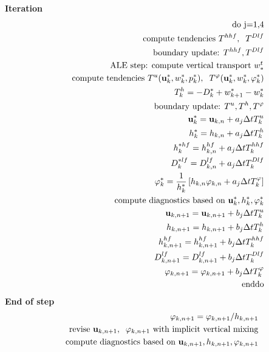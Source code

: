 \documentclass[11pt]{report}
\begin{document}
{\bf Iteration}
\begin{eqnarray} &&
\mbox{do j=1,4} \\&& \hspace{.5cm}
\mbox{compute tendencies } T^{hhf}, \;\;T^{Dlf} \\ && \hspace{.5cm}
\mbox{boundary update: } T^{hhf},T^{Dlf}\\&& \hspace{.5cm}
\mbox{ALE step: compute vertical transport $w^t_*$} \\ && \hspace{.5cm}
\mbox{compute tendencies } 
T^u({\bf u}_k^*,w_k^*,p_k^*), \;\;
T^\varphi({\bf u}_k^*,w_k^*,\varphi_k^*) \\ && \hspace{.5cm}\hspace{.5cm}
T^h_k = -D_k^* + w_{k+1}^* - w_{k}^* \\ && \hspace{.5cm}
\mbox{boundary update: } T^u,T^h,T^\varphi\\&& \hspace{.5cm}
{\bf u}^*_k = {\bf u}_{k,n} + a_j \Delta t T^u_k \\&& \hspace{.5cm}
h^*_k = h_{k,n} + a_j \Delta t T^h_k \\&& \hspace{.5cm}
h^{*hf}_k = h^{hf}_{k,n} + a_j \Delta t T^{hhf}_k \\&& \hspace{.5cm}
D^{*lf}_k = D^{lf}_{k,n} + a_j \Delta t T^{Dlf}_k \\&& \hspace{.5cm}
{\varphi}_k^* = \frac{1}{h_k^*} \left[
h_{k,n} \varphi_{k,n} 
+ a_j \Delta t  T^\varphi_k \right]
\\&& \hspace{.5cm}
\mbox{compute diagnostics based on }{\bf u}_k^*,h_k^*,\varphi_k^* \\&& \hspace{.5cm}
{\bf u}_{k,n+1} = {\bf u}_{k,n+1} + b_j \Delta t T^u_k \\&& \hspace{.5cm}
h_{k,n+1} = h_{k,n+1} + b_j \Delta t T^h_k \\&& \hspace{.5cm}
h^{hf}_{k,n+1} = h^{hf}_{k,n+1} + b_j \Delta t T^{hhf}_k \\&& \hspace{.5cm}
D^{lf}_{k,n+1} = D^{lf}_{k,n+1} + b_j \Delta t T^{Dlf}_k \\&& \hspace{.5cm}
{\varphi}_{k,n+1} = 
 \varphi_{k,n+1} 
+ b_j \Delta t  T^\varphi_k \\&&
\mbox{enddo}
\end{eqnarray}
{\bf End of step}
\begin{eqnarray} &&
\varphi_{k,n+1} = 
 \varphi_{k,n+1} / h_{k,n+1} \\&&
\mbox{revise } {\bf u}_{k,n+1},\;\;\varphi_{k,n+1} \mbox{ with implicit vertical mixing}\\&&
\mbox{compute diagnostics based on }{\bf u}_{k,n+1},h_{k,n+1},\varphi_{k,n+1} 
\end{eqnarray}
\end{document}
